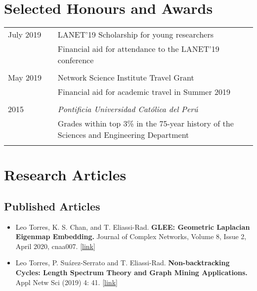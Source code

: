 \documentclass[12pt,]{scrartcl}
\begin{document}
\section{Selected Honours and
Awards}\label{selected-honours-and-awards}

\begin{table}[!h]
{\def\arraystretch{1}\tabcolsep=0pt
\begin{tabular}{p{0.2\linewidth}p{0.8\linewidth}}

July 2019 & LANET'19 Scholarship for young researchers \\
& Financial aid for attendance to the LANET'19 conference \\ \\

May 2019 & Network Science Institute Travel Grant \\
& Financial aid for academic travel in Summer 2019 \\ \\

2015 & \textit{Pontificia Universidad Católica del Perú} \\
& Grades within top 3\% in the 75-year history of the Sciences and Engineering Department \\ \\

\end{tabular}}
\end{table}


\newpage
\section{Research Articles}\label{publications}

\subsection{Published Articles}\label{articles}

\begin{itemize}
\leftskip-0.25in %

\item Leo Torres, K. S. Chan, and T. Eliassi-Rad. \textbf{GLEE: Geometric Laplacian Eigenmap Embedding.} Journal of Complex Networks, Volume 8, Issue 2, April 2020, cnaa007. \href{https://academic.oup.com/comnet/article/8/2/cnaa007/5775302?guestAccessKey=a6a1e399-bc7d-48db-82ad-5a3beabd81bf}{[link]} 

\item Leo Torres, P. Su\'arez-Serrato and T. Eliassi-Rad.  \textbf{Non-backtracking Cycles: Length Spectrum Theory and Graph Mining Applications.}  Appl Netw Sci (2019) 4: 41. \href{https://doi.org/10.1007/s41109-019-0147-y}{[link]}

\end{itemize}
\end{document}
